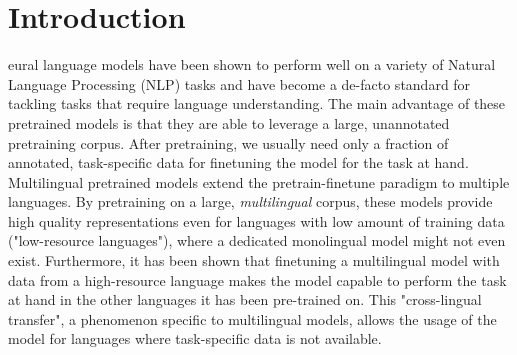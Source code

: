 
\chapter{Introduction}
\label{chap:introduction}





eural language models have been shown to perform well on a variety of Natural Language Processing (NLP) tasks and have become a de-facto standard for tackling tasks that require language understanding. The main advantage of these pretrained models is that they are able to leverage a large, unannotated pretraining corpus. After pretraining, we usually need only a fraction of annotated, task-specific data for finetuning the model for the task at hand. \cite{devlin_bert_2019,radford_improving_nodate} Multilingual pretrained models extend the pretrain-finetune paradigm to multiple languages. By pretraining on a large, \textit{multilingual} corpus, these models provide high quality representations even for languages with low amount of training data ("low-resource languages"), where a dedicated monolingual model might not even exist. Furthermore, it has been shown that finetuning a multilingual model with data from a high-resource language makes the model capable to perform the task at hand in the other languages it has been pre-trained on. This "cross-lingual transfer", a phenomenon specific to multilingual models, allows the usage of the model for languages where task-specific data is not available. \cite{k_cross-lingual_2022,conneau_unsupervised_2020-1}

